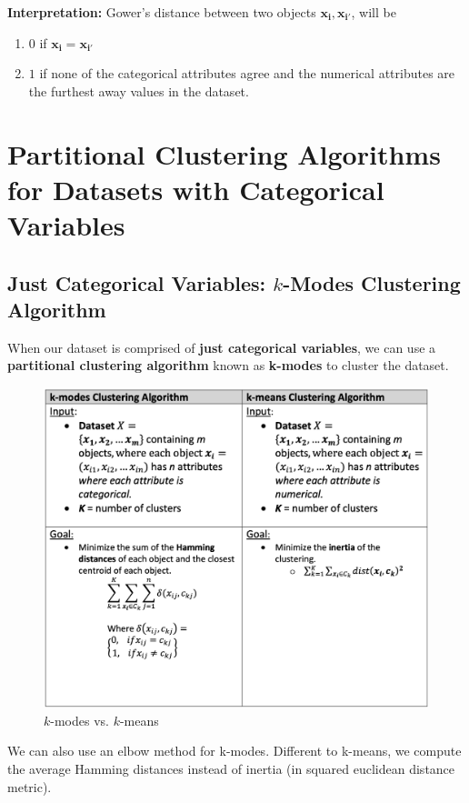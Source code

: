 \documentclass[11pt]{elegantbook}
\begin{document}
\textbf{Interpretation:} Gower's distance between two objects $\boldsymbol{x}_{\boldsymbol{i}}, \boldsymbol{x}_{\boldsymbol{i'}}$, will be
\begin{enumerate}
    \item $0$ if $\boldsymbol{x}_{\boldsymbol{i}}= \boldsymbol{x}_{\boldsymbol{i'}}$
    \item $1$ if none of the categorical attributes agree and the numerical attributes are the furthest away values in the dataset.
\end{enumerate}

\section{Partitional Clustering Algorithms for Datasets with Categorical Variables}

\subsection{Just Categorical Variables: $k$-Modes Clustering Algorithm}
When our dataset is comprised of \textbf{just categorical variables}, we can use a \textbf{partitional clustering algorithm} known as \textbf{k-modes} to cluster the dataset.
\begin{center}\begin{figure}[htbp]
    \centering
    \includegraphics[scale=0.2]{kmodes.png}
    \caption{$k$-modes vs. $k$-means}
    \label{}
\end{figure}\end{center}
We can also use an elbow method for k-modes. Different to k-means, we compute the average Hamming distances instead of inertia (in squared euclidean distance metric).
\end{document}
